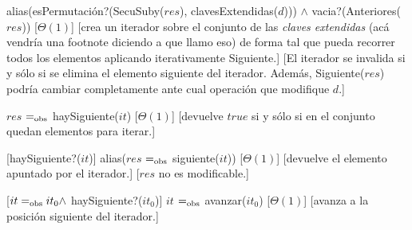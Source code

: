 \begin{Interfaz}
  {alias(esPermutación?(SecuSuby($res$), clavesExtendidas($d$))) $\land$ vacia?(Anteriores($res$))}
  [$\Theta(1)$]
  [crea un iterador sobre el conjunto de las \textit{claves extendidas} (acá vendría una footnote diciendo a que llamo eso)
  de forma tal que pueda recorrer todos los elementos aplicando iterativamente Siguiente.]
  [El iterador se invalida si y sólo si se elimina el elemento siguiente del iterador. Además, Siguiente($res$) podría cambiar completamente ante cual operación que modifique $d$.]
  
  {$res$ $=_{\mathrm{obs}}$ haySiguiente($it$)}
  [$\Theta(1)$]
  [devuelve $true$ si y sólo si en el conjunto quedan elementos para iterar.]  

  [haySiguiente?($it$)]  
  {alias($res$ $=_{\mathrm{obs}}$ siguiente($it$))}
  [$\Theta(1)$]
  [devuelve el elemento apuntado por el iterador.]  
  [$res$ no es modificable.]
  
  [$it =_{\mathrm{obs}} it_0 \land$ haySiguiente?($it_0$)]  
  {$it$ $=_{\mathrm{obs}}$ avanzar($it_0$)}
  [$\Theta(1)$]
  [avanza a la posición siguiente del iterador.] 
  
\end{Interfaz}

